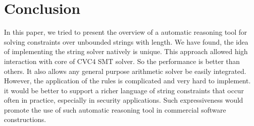 \section{Conclusion}
\label{sec:conclusion}
In this paper, we tried to present the overview of a automatic reasoning tool for solving constraints over unbounded strings with length. We have found, the idea of implementing the string solver natively is unique. This approach allowed high interaction with core of CVC4 SMT solver. So the performance is better than others. It also allows any general purpose arithmetic solver be easily integrated. However, the application of the rules is complicated and very hard to implement. it would be better to support a richer language of string constraints that occur often in practice, especially in security applications. Such expressiveness would promote the use of such automatic reasoning tool in commercial software constructions. 